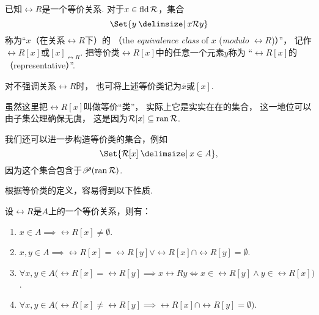 \begin{definition}
已知\(\rel{R}\)是一个等价关系.
对于\(x \in \operatorname{fld} \mathcal{R}\)，集合\[
	\Set{ y \given x \rel{R} y }
\]
称为“\(x\)（在关系\(\rel{R}\)下）的%
（the \emph{equivalence class} of \(x\) (\emph{modulo} \(\rel{R}\))）”，
记作\(\rel{R}[x]\)或\([x]_{\rel{R}}\).
把等价类\(\rel{R}[x]\)中的任意一个元素\(y\)称为%
“\(\rel{R}[x]\)的（representative）”.

对不强调关系\(\rel{R}\)时，
也可将上述等价类记为\(\overline{x}\)或\([x]\).
\end{definition}

虽然这里把\(\rel{R}[x]\)叫做等价“类”，
实际上它是实实在在的集合，
这一地位可以由子集公理确保无虞，
这是因为\(\mathcal{R}[x] \subseteq \operatorname{ran} \mathcal{R}\).

我们还可以进一步构造等价类的集合，例如\[
	\Set{ \rel{R}[x] \given x \in A },
\]
因为这个集合包含于\(\mathscr{P}(\operatorname{ran} \mathcal{R})\).

根据等价类的定义，容易得到以下性质.
\begin{property}
设\(\rel{R}\)是\(A\)上的一个等价关系，则有：
\begin{enumerate}
	\item \(x \in A
	\implies \rel{R}[x] \neq \emptyset\).

	\item \(x,y \in A
	\implies \rel{R}[x] = \rel{R}[y]
	\lor \rel{R}[x] \cap \rel{R}[y] = \emptyset\).

	\item \(\forall x,y \in A \bigl( \rel{R}[x] = \rel{R}[y]
	\implies x \rel{R} y
	\iff x \in \rel{R}[y] \land y \in \rel{R}[x] \bigr)\).

	\item \(\forall x,y \in A \bigl( \rel{R}[x] \neq \rel{R}[y]
	\implies \rel{R}[x] \cap \rel{R}[y] = \emptyset \bigr)\).
\end{enumerate}
\end{property}



